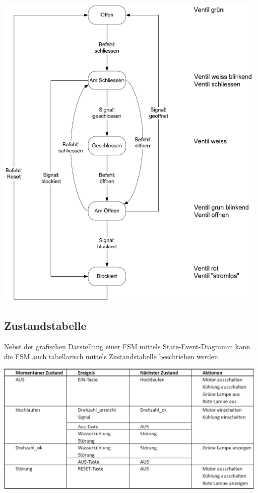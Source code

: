 \begin{center}
    \includegraphics[width=0.8\columnwidth]{images/state_event_example.png}
\end{center}


\subsection{Zustandstabelle}

Nebst der grafischen Darstellung einer FSM mittels State-Event-Diagramm kann die FSM auch tabellarisch mittels Zustandstabelle 
beschrieben werden.



\includegraphics[width=\columnwidth]{images/zustandstabelle.png}